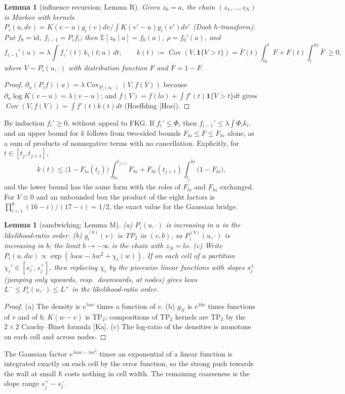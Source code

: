 \documentclass[11pt,a4paper]{article}
\newtheorem{lemma}[theorem]{Lemma}
\theoremstyle{definition}
\theoremstyle{remark}
\newcommand{\E}{\mathbb{E}}
\newcommand{\Cov}{\operatorname{Cov}}
\begin{document}
\begin{lemma}[influence recursion; Lemma R]\label{lem:R}
Given $z_0=a$, the chain $(z_1,\dots,z_N)$ is Markov with kernels $P_i(u,dv)=K(v-u)g_i(v)dv/\!\int K(v'-u)g_i(v')dv'$ \textup{(}Doob $h$-transform\textup{)}. Put $f_8=\mathrm{id}$, $f_{i-1}=P_if_i$; then $\E[z_8\mid a]=f_0(a)$, $\rho=f_0'(a)$, and
\[
f_{i-1}'(u)=\lambda\int f_i'(t)\,k_i(t;u)\,dt,\qquad k(t):=\Cov(V,\mathbf 1\{V>t\})=\bar F(t)\!\int_{lo}^{t}\!F+F(t)\!\int_t^{hi}\!\bar F\ \ge0 ,
\]
where $V\sim P_i(u,\cdot)$ with distribution function $F$ and $\bar F=1-F$.
\end{lemma}
\begin{proof}
$\partial_u(P_if)(u)=\lambda\Cov_{P_i(u,\cdot)}(V,f(V))$ because $\partial_u\log K(v-u)=\lambda(v-u)$; and $f(V)=f(lo)+\int f'(t)\mathbf 1\{V>t\}dt$ gives $\Cov(V,f(V))=\int f'(t)k(t)dt$ (Hoeffding [Hoe]).
\end{proof}
By induction $f_i'\ge0$, without appeal to FKG. If $f_i'\le\Phi_i$ then $f_{i-1}'\le\lambda\int\Phi_ik_i$, and an upper bound for $k$ follows from two-sided bounds $F_{lo}\le F\le F_{hi}$ alone, as a sum of products of nonnegative terms with no cancellation. Explicitly, for $t\in[t_j,t_{j+1}]$,
\[
k(t)\le\big(1-F_{lo}(t_j)\big)\int_{lo}^{t_{j+1}}F_{hi}+F_{hi}(t_{j+1})\int_{t_j}^{hi}\big(1-F_{lo}\big),
\]
and the lower bound has the same form with the roles of $F_{lo}$ and $F_{hi}$ exchanged. For $V\equiv0$ and an unbounded box the product of the eight factors is $\prod_{i=1}^8(16-i)/(17-i)=1/2$, the exact value for the Gaussian bridge.

\begin{lemma}[sandwiching; Lemma M]\label{lem:M}
\textup{(a)} $P_i(u,\cdot)$ is increasing in $u$ in the likelihood-ratio order. \textup{(b)} $g_i^{(b)}(v)$ is TP$_2$ in $(v,b)$, so $P_i^{(b)}(u,\cdot)$ is increasing in $b$; the limit $b\to-\infty$ is the chain with $z_N=lo$. \textup{(c)} Write $P_i(u,dw)\propto\exp(\lambda uw-\lambda w^2+\chi_i(w))$. If on each cell of a partition $\chi_i'\in[s_j^-,s_j^+]$, then replacing $\chi_i$ by the piecewise linear functions with slopes $s_j^\pm$ \textup{(}jumping only upwards, resp.\ downwards, at nodes\textup{)} gives laws $L^-\le P_i(u,\cdot)\le L^+$ in the likelihood-ratio order.
\end{lemma}
\begin{proof}
(a) The density is $e^{\lambda uv}$ times a function of $v$. (b) $g_N$ is $e^{\lambda bv}$ times functions of $v$ and of $b$; $K(w-v)$ is TP$_2$; compositions of TP$_2$ kernels are TP$_2$ by the $2\times2$ Cauchy--Binet formula [Ka]. (c) The log-ratio of the densities is monotone on each cell and across nodes.
\end{proof}
The Gaussian factor $e^{\lambda uw-\lambda w^2}$ times an exponential of a linear function is integrated exactly on each cell by the error function, so the strong push towards the wall at small $\hbar$ costs nothing in cell width. The remaining coarseness is the slope range $s_j^+-s_j^-$.
\end{document}
